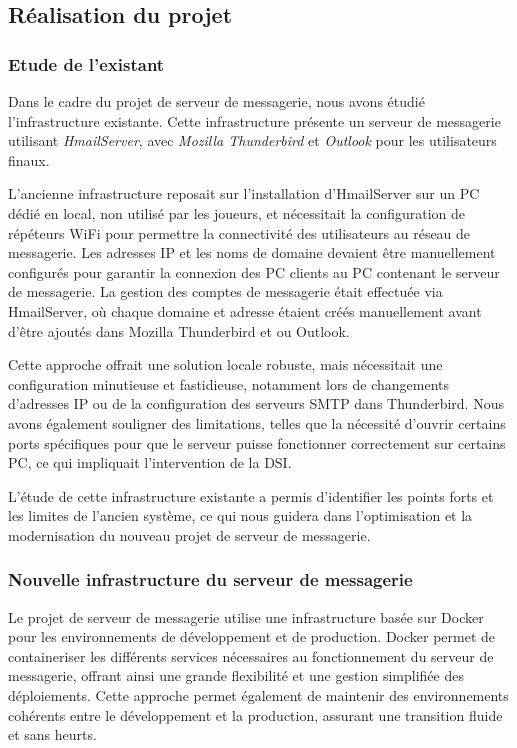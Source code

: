 \subsection{Réalisation du projet}

\subsubsection{Etude de l'existant}

Dans le cadre du projet de serveur de messagerie, nous avons étudié l'infrastructure existante.
Cette infrastructure présente un serveur de messagerie utilisant \textit{HmailServer}, avec \textit{Mozilla Thunderbird} et \textit{Outlook} pour les utilisateurs finaux.

L'ancienne infrastructure reposait sur l'installation d'HmailServer sur un PC dédié en local, non utilisé par les joueurs, et nécessitait la configuration de répéteurs WiFi pour permettre la connectivité des utilisateurs au réseau de messagerie.
Les adresses IP et les noms de domaine devaient être manuellement configurés pour garantir la connexion des PC clients au PC contenant le serveur de messagerie.
La gestion des comptes de messagerie était effectuée via HmailServer, où chaque domaine et adresse étaient créés manuellement avant d'être ajoutés dans Mozilla Thunderbird et ou Outlook.

Cette approche offrait une solution locale robuste, mais nécessitait une configuration minutieuse et fastidieuse, notamment lors de changements d'adresses IP ou de la configuration des serveurs SMTP dans Thunderbird.
Nous avons également souligner des limitations, telles que la nécessité d'ouvrir certains ports spécifiques pour que le serveur puisse fonctionner correctement sur certains PC, ce qui impliquait l'intervention de la DSI.

L'étude de cette infrastructure existante a permis d'identifier les points forts et les limites de l'ancien système, ce qui nous guidera dans l'optimisation et la modernisation du nouveau projet de serveur de messagerie.


\subsubsection{Nouvelle infrastructure du serveur de messagerie}



Le projet de serveur de messagerie utilise une infrastructure basée sur Docker pour les environnements de développement et de production. Docker permet de containeriser les différents services nécessaires au fonctionnement du serveur de messagerie, offrant ainsi une grande flexibilité et une gestion simplifiée des déploiements. Cette approche permet également de maintenir des environnements cohérents entre le développement et la production, assurant une transition fluide et sans heurts.

